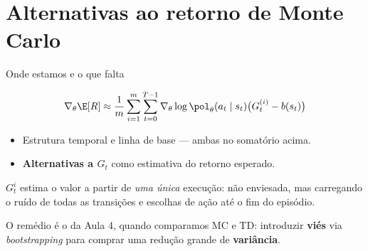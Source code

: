 \documentclass[aspectratio=169, 11pt]{beamer}
\newcommand{\thv}{\theta}                       %
\newcommand{\polth}{\pol_{\thv}}                %
\newcommand{\gth}{\nabla_{\thv}}                %
\begin{document}
\section{Alternativas ao retorno de Monte Carlo}

\begin{frame}{Onde estamos e o que falta}

  \[
    \gth \E[R] \approx \frac{1}{m}\sum_{i=1}^{m}\sum_{t=0}^{T-1}
      \gth \log \polth(a_t\mid s_t)\bigl(G^{(i)}_t - b(s_t)\bigr)
  \]

  \begin{itemize}\setlength{\itemsep}{0.15ex}
    \item[\checkmark] Estrutura temporal e linha de base --- ambas no
      somatório acima.
    \item[$\square$] \textbf{Alternativas a $G_t$} como estimativa do retorno
      esperado.
  \end{itemize}

  \begin{alertabox}
    $G^i_t$ estima o valor a partir de \emph{uma única} execução: não
    enviesada, mas carregando o ruído de todas as transições e escolhas de
    ação até o fim do episódio.
  \end{alertabox}

  \begin{ideiabox}
    O remédio é o da Aula 4, quando comparamos MC e TD: introduzir
    \textbf{viés} via \emph{bootstrapping} para comprar uma redução grande de
    \textbf{variância}.
  \end{ideiabox}
\end{frame}
\end{document}
